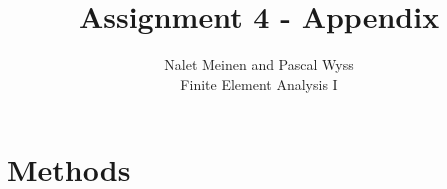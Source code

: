 \documentclass[12pt]{article}
\begin{document}


\title{Assignment 4 - Appendix}%
\author{Nalet Meinen and Pascal Wyss\\ %
Finite Element Analysis I
}
\maketitle

\section{Methods}
\end{document}
